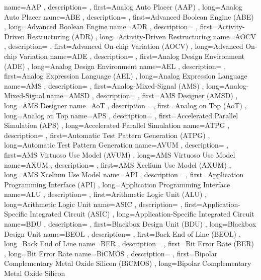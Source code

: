 \usepackage[]{glossaries}
\makeglossaries


{ name={AAP}
, description={}
, first={Analog Auto Placer (AAP)}
, long={Analog Auto Placer}
}
{ name={ABE}
, description={}
, first={Advanced Boolean Engine (ABE)}
, long={Advanced Boolean Engine}
}
{ name={ADR}
, description={}
, first={Activity-Driven Restructuring (ADR)}
, long={Activity-Driven Restructuring}
}
{ name={AOCV}
, description={}
, first={Advanced On-chip Variation (AOCV)}
, long={Advanced On-chip Variation}
}
{ name={ADE}
, description={}
, first={Analog Design Environment (ADE)}
, long={Analog Design Environment}
}
{ name={AEL}
, description={}
, first={Analog Expression Language (AEL)}
, long={Analog Expression Language}
}
{ name={AMS}
, description={}
, first={Analog-Mixed-Signal (AMS)}
, long={Analog-Mixed-Signal}
}
{ name={AMSD}
, description={}
, first={AMS Designer (AMSD)}
, long={AMS Designer}
}
{ name={AoT}
, description={}
, first={Analog on Top (AoT)}
, long={Analog on Top}
}
{ name={APS}
, description={}
, first={Accelerated Parallel Simulation (APS)}
, long={Accelerated Parallel Simulation}
}
{ name={ATPG}
, description={}
, first={Automatic Test Pattern Generation (ATPG)}
, long={Automatic Test Pattern Generation}
}
{ name={AVUM}
, description={}
, first={AMS Virtuoso Use Model (AVUM)}
, long={AMS Virtuoso Use Model}
}
{ name={AXUM}
, description={}
, first={AMS Xcelium Use Model (AXUM)}
, long={AMS Xcelium Use Model}
}
{ name={API}
, description={}
, first={Application Programming Interface (API)}
, long={Application Programming Interface}
}
{ name={ALU}
, description={}
, first={Arithmetic Logic Unit (ALU)}
, long={Arithmetic Logic Unit}
}
{ name={ASIC}
, description={}
, first={Application-Specific Integrated Circuit (ASIC)}
, long={Application-Specific Integrated Circuit}
}
{ name={BDU}
, description={}
, first={Blackbox Design Unit (BDU)}
, long={Blackbox Design Unit}
}
{ name={BEOL}
, description={}
, first={Back End of Line (BEOL)}
, long={Back End of Line}
}
{ name={BER}
, description={}
, first={Bit Error Rate (BER)}
, long={Bit Error Rate}
}
{ name={BiCMOS}
, description={}
, first={Bipolar Complementary Metal Oxide Silicon (BiCMOS)}
, long={Bipolar Complementary Metal Oxide Silicon}
}
